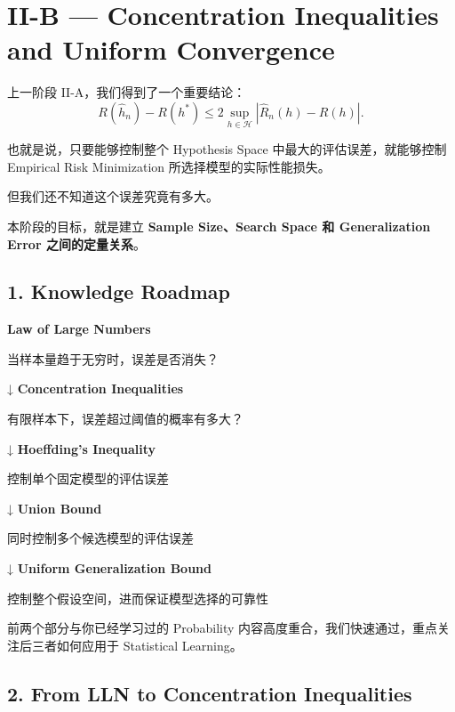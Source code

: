 \hypertarget{part-2-14-0001-ii-b-concentration-inequalities-and-uniform-convergence}{%
\section{II-B --- Concentration Inequalities and Uniform Convergence}\label{part-2-14-0001-ii-b-concentration-inequalities-and-uniform-convergence}}

上一阶段 II-A，我们得到了一个重要结论：
\[R(\hat h_n)-R(h^*)
\leq
2\sup_{h\in\mathcal H}
|\widehat R_n(h)-R(h)|.\]

也就是说，只要能够控制整个 Hypothesis Space 中最大的评估误差，就能够控制 Empirical Risk Minimization 所选择模型的实际性能损失。

但我们还不知道这个误差究竟有多大。

本阶段的目标，就是建立 \textbf{Sample Size、Search Space 和 Generalization Error 之间的定量关系}。

\hypertarget{part-2-14-0001-knowledge-roadmap}{%
\subsection{1. Knowledge Roadmap}\label{part-2-14-0001-knowledge-roadmap}}

\textbf{Law of Large Numbers}

当样本量趋于无穷时，误差是否消失？

↓ \textbf{Concentration Inequalities}

有限样本下，误差超过阈值的概率有多大？

↓ \textbf{Hoeffding's Inequality}

控制单个固定模型的评估误差

↓ \textbf{Union Bound}

同时控制多个候选模型的评估误差

↓ \textbf{Uniform Generalization Bound}

控制整个假设空间，进而保证模型选择的可靠性

前两个部分与你已经学习过的 Probability 内容高度重合，我们快速通过，重点关注后三者如何应用于 Statistical Learning。

\hypertarget{part-2-14-0001-from-lln-to-concentration-inequalities}{%
\subsection{2. From LLN to Concentration Inequalities}\label{part-2-14-0001-from-lln-to-concentration-inequalities}}


